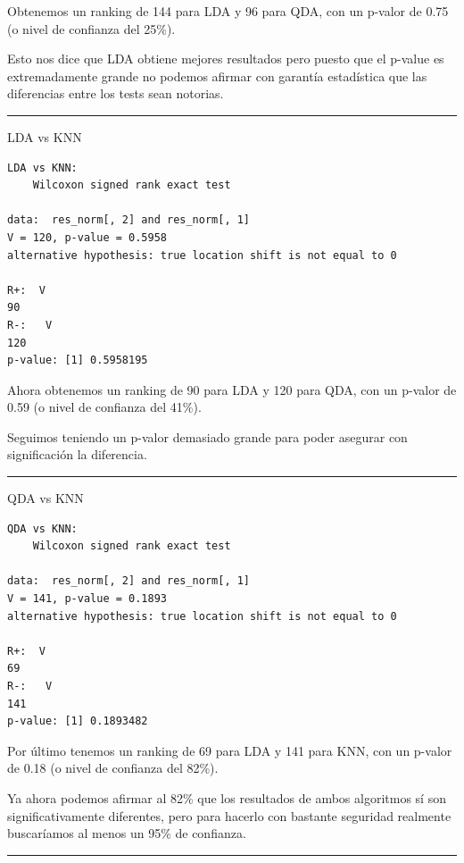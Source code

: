 \documentclass[
]{article}
\begin{document}
Obtenemos un ranking de 144 para LDA y 96 para QDA, con un p-valor de
0.75 (o nivel de confianza del 25\%).

Esto nos dice que LDA obtiene mejores resultados pero puesto que el
p-value es extremadamente grande no podemos afirmar con garantía
estadística que las diferencias entre los tests sean notorias.

\begin{center}\rule{0.5\linewidth}{0.5pt}\end{center}

LDA vs KNN

\begin{verbatim}
LDA vs KNN: 
    Wilcoxon signed rank exact test

data:  res_norm[, 2] and res_norm[, 1]
V = 120, p-value = 0.5958
alternative hypothesis: true location shift is not equal to 0

R+:  V 
90 
R-:   V 
120 
p-value: [1] 0.5958195
\end{verbatim}

Ahora obtenemos un ranking de 90 para LDA y 120 para QDA, con un p-valor
de 0.59 (o nivel de confianza del 41\%).

Seguimos teniendo un p-valor demasiado grande para poder asegurar con
significación la diferencia.

\begin{center}\rule{0.5\linewidth}{0.5pt}\end{center}

QDA vs KNN

\begin{verbatim}
QDA vs KNN: 
    Wilcoxon signed rank exact test

data:  res_norm[, 2] and res_norm[, 1]
V = 141, p-value = 0.1893
alternative hypothesis: true location shift is not equal to 0

R+:  V 
69 
R-:   V 
141 
p-value: [1] 0.1893482
\end{verbatim}

Por último tenemos un ranking de 69 para LDA y 141 para KNN, con un
p-valor de 0.18 (o nivel de confianza del 82\%).

Ya ahora podemos afirmar al 82\% que los resultados de ambos algoritmos
sí son significativamente diferentes, pero para hacerlo con bastante
seguridad realmente buscaríamos al menos un 95\% de confianza.

\begin{center}\rule{0.5\linewidth}{0.5pt}\end{center}
\end{document}

